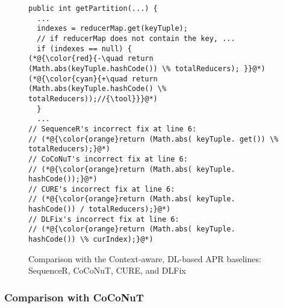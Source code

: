 \begin{figure}[t]
	\centering
	\begin{lstlisting}[]
public int getPartition(...) {
  ...
  indexes = reducerMap.get(keyTuple);
  // if reducerMap does not contain the key, ...
  if (indexes == null) {
(*@{\color{red}{-\quad return (Math.abs(keyTuple.hashCode()) \% totalReducers);	}}@*)
(*@{\color{cyan}{+\quad return (Math.abs(keyTuple.hashCode() \% totalReducers));//{\tool}}}@*)
  }
  ...
// SequenceR's incorrect fix at line 6:
// (*@{\color{orange}return (Math.abs( keyTuple. get()) \% totalReducers);}@*)
// CoCoNuT's incorrect fix at line 6:
// (*@{\color{orange}return (Math.abs( keyTuple. hashCode());}@*)
// CURE's incorrect fix at line 6:
// (*@{\color{orange}return (Math.abs( keyTuple. hashCode()) / totalReducers);}@*)
// DLFix's incorrect fix at line 6:
// (*@{\color{orange}return (Math.abs( keyTuple. hashCode()) \% curIndex);}@*)
	\end{lstlisting}
        \vspace{-15pt}
	\caption{Comparison with the Context-aware, DL-based APR baselines: SequenceR, CoCoNuT, CURE, and DLFix}
	\label{example_3}
\end{figure}



\subsubsection{\bf Comparison with CoCoNuT}

